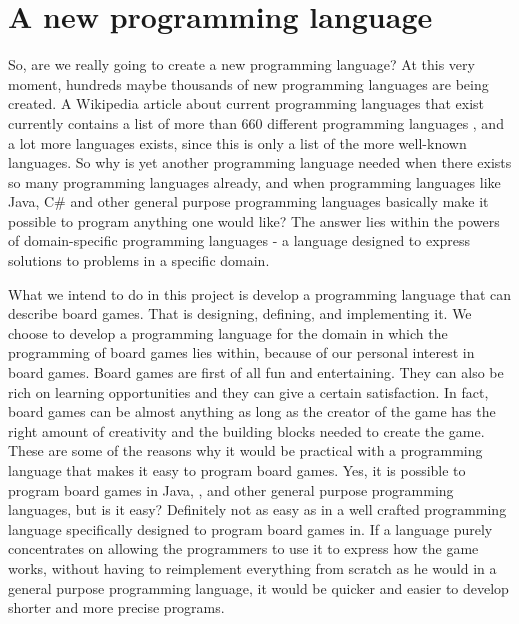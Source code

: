\chapter{A new programming language}
\label{chap:introduction}

So, are we really going to create a new programming language? At this very
moment, hundreds maybe thousands of new programming languages are being created.
A Wikipedia article about current programming languages that exist currently
contains a list of more than $660$ different programming languages
\cite{listofprogramminglanguages}, and a lot more languages exists, since this
is only a list of the more well-known languages. So why is yet another
programming language needed when there exists so many programming languages
already, and when programming languages like Java, C\# and other general purpose
programming languages basically make it possible to program anything one would
like? The answer lies within the powers of domain-specific programming languages
- a language designed to express solutions to problems in a specific domain.
\cite{domainspecificprogramminglanguagedefinition}

What we intend to do in this project is develop a programming language that can
describe board games. That is designing, defining, and implementing it. We
choose to develop a programming language for the domain in which the programming
of board games lies within, because of our personal interest in board games.
Board games are first of all fun and entertaining. They can also be rich on
learning opportunities \cite{whyboardgames1?} and they can give a certain
satisfaction. \cite{whyboardgames2?} In fact, board games can be almost anything
as long as the creator of the game has the right amount of creativity and the
building blocks needed to create the game. These are some of the reasons why it
would be practical with a programming language that makes it easy to program
board games. Yes, it is possible to program board games in Java, \CS{}, and 
other general purpose programming languages, but is it easy? Definitely not as
easy as in a well crafted programming language specifically designed to program
board games in. If a language purely concentrates on allowing the programmers to
use it to express how the game works, without having to reimplement everything
from scratch as he would in a general purpose programming language, it would be
quicker and easier to develop shorter and more precise programs.  

